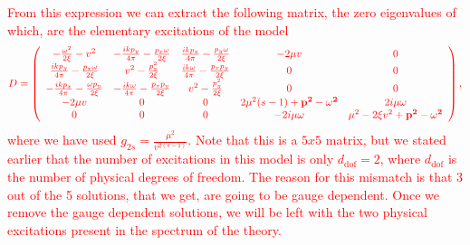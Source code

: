  \textcolor{red}{From this expression we can extract the following matrix, the zero eigenvalues of which, are the elementary excitations of the model}
\begin{align}
   \textcolor{red}{D= \left(
\begin{array}{ccccc}
    -\frac{\omega ^2}{2 \xi }-v^2 & -\frac{i k p_y}{4 \pi } - \frac{p_x \omega}{2\xi} & \frac{i k  p_x}{4 \pi } - \frac{p_y \omega}{2\xi} & -2 \mu  v & 0 \\
 \frac{i k p_y}{4 \pi } - \frac{p_x \omega}{2\xi} & v^2-\frac{p_x^2}{2 \xi } & \frac{i k \omega }{4 \pi } - \frac{p_x p_y}{2\xi}& 0 & 0 \\
 -\frac{i k p_x}{4 \pi } - \frac{\omega p_y}{2\xi} & -\frac{i k \omega }{4 \pi } - \frac{p_x p_y}{2\xi}&  v^2-\frac{p_y^2}{2 \xi } & 0 & 0 \\
    -2 \mu  v & 0 & 0 & 2 \mu ^2 (s-1)+\bf{p}^2-\omega ^2 & 2 i \mu  \omega  \\
 0 & 0 & 0 & -2 i \mu  \omega  & \mu^2 -2 \xi v^2+\bf{p}^2-\omega^2 \\
\end{array}
    \right),} \nonumber
\end{align}
\textcolor{red}{where we have used $g_{2s} =\frac{ \mu^2}{ v^{2(s-1)}}$. Note that this is a $5x5$ matrix, but we stated earlier that the number of excitations in this model is only $d_{\text{dof}}=2$, where $d_{\text{dof}}$ is the number of physical degrees of freedom. The reason for this mismatch is that 3 out of the 5 solutions, that we get, are going to be gauge dependent. Once we remove the gauge dependent solutions, we will be left with the two physical excitations present in the spectrum of the theory.}

